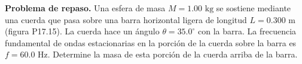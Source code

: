 \item \textbf{Problema de repaso.}
Una esfera de masa $M = 1.00\text{ kg}$ se sostiene mediante una cuerda que pasa sobre una barra horizontal ligera de longitud $L = 0.300\text{ m}$ (figura P17.15). La cuerda hace un ángulo $\theta = 35.0^\circ$ con la barra. La frecuencia fundamental de ondas estacionarias en la porción de la cuerda sobre la barra es $f = 60.0\text{ Hz}$. Determine la masa de esta porción de la cuerda arriba de la barra.